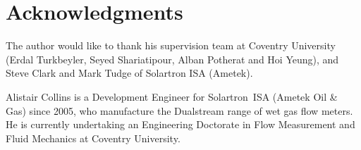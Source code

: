 \documentclass[journal]{IEEEtran}
\begin{document}


\vfill\eject




%
%
%

\section*{Acknowledgments}
The author would like to thank his supervision team at Coventry University (Erdal Turkbeyler, Seyed Shariatipour, Alban Potherat and Hoi Yeung), and Steve Clark and Mark Tudge of Solartron ISA (Ametek). 

% 

\begin{IEEEbiographynophoto}{Alistair Collins}
is a Development Engineer for Solartron~ISA (Ametek Oil \& Gas) since 2005, who manufacture the Dualstream range of wet gas flow meters.  He is currently undertaking an Engineering Doctorate in Flow Measurement and Fluid Mechanics at Coventry University.
\end{IEEEbiographynophoto}
\end{document}
